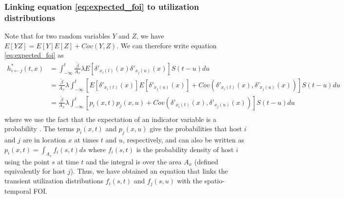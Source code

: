 \documentclass[letterpaper]{article}
\begin{document}
\subsubsection*{Linking equation \ref{eq:expected_foi} to utilization distributions}

Note that for two random variables $Y$ and $Z$, we have $E[YZ] = E[Y]E[Z] + Cov(Y, Z)$.  We can therefore write equation \ref{eq:expected_foi} as
\begin{equation}
    \begin{aligned}
        h^*_{i \leftarrow j}(t, x) &= \int_{-\infty}^{t} \frac{\tilde{\beta}}{A_x} \lambda E[\delta'_{x_i(t)}(x) \delta'_{x_j(u)}(x)] S(t - u) du \\
        &= \frac{\tilde{\beta}}{A_x} \lambda \int_{-\infty}^{t} [E[\delta'_{x_i(t)}(x)] E[\delta'_{x_j(u)}(x)] + Cov(\delta'_{x_i(t)}(x), \delta'_{x_j(u)}(x))] S(t - u) du \\
        &= \frac{\tilde{\beta}}{A_x} \lambda \int_{-\infty}^{t} [p_i(x, t) p_j(x, u) + Cov(\delta'_{x_i(t)}(x), \delta'_{x_j(u)}(x))] S(t - u) du \\
    \end{aligned}
    \label{eq:foi_cov}
\end{equation}
where we use the fact that the expectation of an indicator variable is a probability \citep{Grimmett2001}. The terms $p_i(x, t)$ and $p_j(x,u)$ give the probabilities that host $i$ and $j$ are in location $x$ at times $t$ and $u$, respectively, and can also be written as $p_i(x, t) = \int_{A_x} f_i(s, t) ds$ where $f_i(s, t)$ is the probability density of host $i$ using the point $s$ at time $t$ and the integral is over the area $A_x$ (defined equivalently for host $j$). Thus, we have obtained an equation that links the transient utilization distributions $f_i(s, t)$ and $f_j(s, u)$ with the spatio-temporal FOI.


\end{document}
